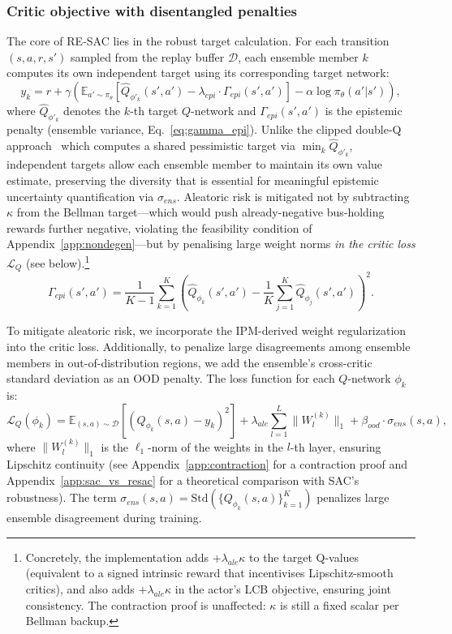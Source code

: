 \documentclass[10pt]{article}
\begin{document}
\subsubsection{Critic objective with disentangled penalties}
The core of RE-SAC lies in the robust target calculation. For each transition $(s, a, r, s')$ sampled from the replay buffer $\mathcal{D}$, each ensemble member $k$ computes its own independent target using its corresponding target network:
\begin{equation}
    y_k = r + \gamma \left( \mathbb{E}_{a' \sim \pi_\theta} \left[ \hat{Q}_{\phi'_k}(s', a') - \lambda_{epi} \cdot \Gamma_{epi}(s', a') \right] - \alpha \log \pi_\theta(a'|s') \right),
    \label{eq:target_y}
\end{equation}
where $\hat{Q}_{\phi'_k}$ denotes the $k$-th target $Q$-network and $\Gamma_{epi}(s', a')$ is the epistemic penalty (ensemble variance, Eq.~\eqref{eq:gamma_epi}).
Unlike the clipped double-Q approach~\cite{Fujimoto2018TD3} which computes a shared pessimistic target via $\min_k \hat{Q}_{\phi'_k}$, independent targets allow each ensemble member to maintain its own value estimate, preserving the diversity that is essential for meaningful epistemic uncertainty quantification via $\sigma_{ens}$.
Aleatoric risk is mitigated not by subtracting $\kappa$ from the Bellman target---which would push already-negative bus-holding rewards further negative, violating the feasibility condition of Appendix~\ref{app:nondegen}---but by penalising large weight norms \emph{in the critic loss} $\mathcal{L}_Q$ (see below).\footnote{Concretely, the implementation adds $+\lambda_{ale}\kappa$ to the target Q-values (equivalent to a signed intrinsic reward that incentivises Lipschitz-smooth critics), and also adds $+\lambda_{ale}\kappa$ in the actor's LCB objective, ensuring joint consistency. The contraction proof is unaffected: $\kappa$ is still a fixed scalar per Bellman backup.}
\begin{equation}
    \Gamma_{epi}(s', a') = \frac{1}{K-1} \sum_{k=1}^K \left( \hat{Q}_{\phi_k}(s', a') - \frac{1}{K} \sum_{j=1}^K \hat{Q}_{\phi_j}(s', a') \right)^2.
\end{equation}

To mitigate aleatoric risk, we incorporate the IPM-derived weight regularization into the critic loss. Additionally, to penalize large disagreements among ensemble members in out-of-distribution regions, we add the ensemble's cross-critic standard deviation as an OOD penalty. The loss function for each $Q$-network $\phi_k$ is:
\begin{equation}
    \mathcal{L}_Q(\phi_k) = \mathbb{E}_{(s,a) \sim \mathcal{D}} \left[ \left( Q_{\phi_k}(s, a) - y_k \right)^2 \right] + \lambda_{ale} \sum_{l=1}^L \|W_{l}^{(k)}\|_1 + \beta_{ood} \cdot \sigma_{ens}(s, a),
\end{equation}
where $\|W_{l}^{(k)}\|_1$ is the $\ell_1$-norm of the weights in the $l$-th layer, ensuring Lipschitz continuity (see Appendix~\ref{app:contraction} for a contraction proof and Appendix~\ref{app:sac_vs_resac} for a theoretical comparison with SAC's robustness). The term $\sigma_{ens}(s, a) = \text{Std}(\{Q_{\phi_k}(s, a)\}_{k=1}^K)$ penalizes large ensemble disagreement during training.
\end{document}
